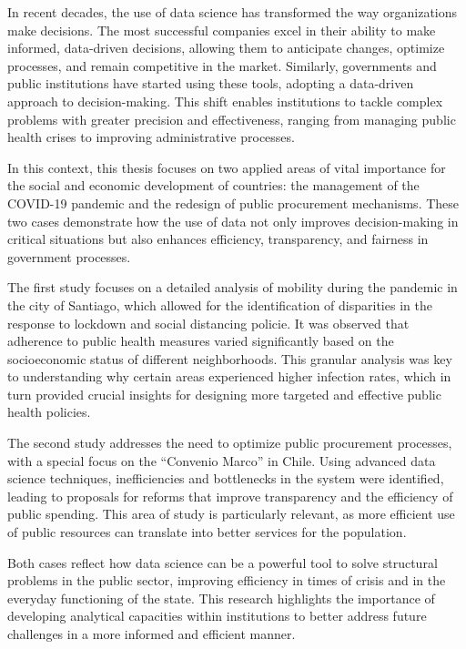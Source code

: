 \begin{intro}


In recent decades, the use of data science has transformed the way organizations make decisions. The most successful companies excel in their ability to make informed, data-driven decisions, allowing them to anticipate changes, optimize processes, and remain competitive in the market. Similarly, governments and public institutions have started using these tools, adopting a data-driven approach to decision-making. This shift enables institutions to tackle complex problems with greater precision and effectiveness, ranging from managing public health crises to improving administrative processes.

In this context, this thesis focuses on two applied areas of vital importance for the social and economic development of countries: the management of the COVID-19 pandemic and the redesign of public procurement mechanisms. These two cases demonstrate how the use of data not only improves decision-making in critical situations but also enhances efficiency, transparency, and fairness in government processes.

The first study focuses on a detailed analysis of mobility during the pandemic in the city of Santiago, which allowed for the identification of disparities in the response to lockdown and social distancing policie. It was observed that adherence to public health measures varied significantly based on the socioeconomic status of different neighborhoods. This granular analysis was key to understanding why certain areas experienced higher infection rates, which in turn provided crucial insights for designing more targeted and effective public health policies.

The second study addresses the need to optimize public procurement processes, with a special focus on the “Convenio Marco” in Chile. Using advanced data science techniques, inefficiencies and bottlenecks in the system were identified, leading to proposals for reforms that improve transparency and the efficiency of public spending. This area of study is particularly relevant, as more efficient use of public resources can translate into better services for the population.

Both cases reflect how data science can be a powerful tool to solve structural problems in the public sector, improving efficiency in times of crisis and in the everyday functioning of the state. This research highlights the importance of developing analytical capacities within institutions to better address future challenges in a more informed and efficient manner.

\end{intro}